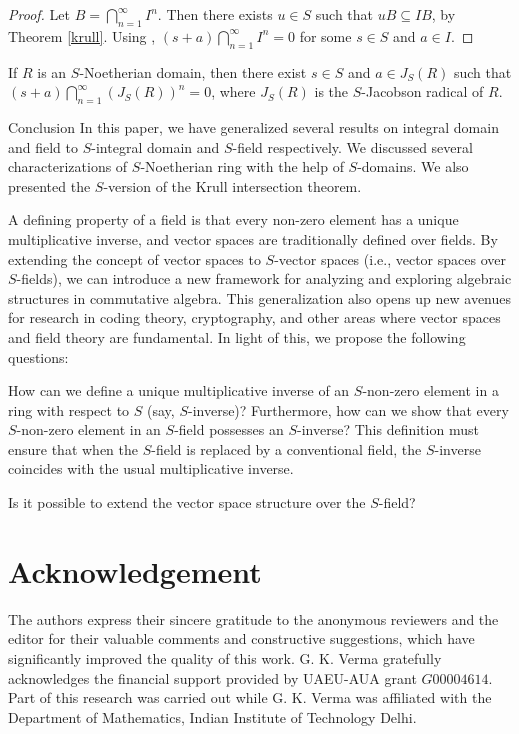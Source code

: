 \documentclass[11pt]{article}
\begin{document}
\begin{proof}
	
	Let $B=\bigcap\limits_{n=1}^{\infty}I^{n}$. Then there exists $u\in S$ such that $uB\subseteq IB$, by Theorem \ref{krull}. Using \cite[Remark 2.1]{ah2020}, $(s+a)\bigcap\limits_{n=1}^{\infty}I^{n}=0$ for some $s\in S$ and $a\in I$.
\end{proof} 
\begin{cor}
	
	If $R$ is an $S$-Noetherian domain, then there exist $s\in S$ and $a\in J_{S}(R)$ such that  $(s+a)\bigcap\limits_{n=1}^{\infty}(J_{S}(R))^{n}=0$, where $J_{S}(R)$ is the $S$-Jacobson radical of $R$.
\end{cor}


	\begin{section}{Conclusion}
		In this paper, we have generalized several results on integral domain and field to $S$-integral domain and $S$-field respectively. We discussed several characterizations of $S$-Noetherian ring with the help of $S$-domains. We also presented the $S$-version of the Krull intersection theorem.
		
		A defining property of a field is that every non-zero element has a unique multiplicative inverse, and vector spaces are traditionally defined over fields. By extending the concept of vector spaces to $S$-vector spaces (i.e., vector spaces over $S$-fields), we can introduce a new framework for analyzing and exploring algebraic structures in commutative algebra. This generalization also opens up new avenues for research in coding theory, cryptography, and other areas where vector spaces and field theory are fundamental. In light of this, we propose the following questions:
		\begin{question}
			How can we define a unique multiplicative inverse of an $S$-non-zero element in a ring with respect to $S$ (say, $S$-inverse)? Furthermore, how can we show that every $S$-non-zero element in an $S$-field possesses an $S$-inverse? This definition must ensure that when the $S$-field is replaced by a conventional field, the $S$-inverse coincides with the usual multiplicative inverse.
		\end{question}
		\begin{question}
			Is it possible to extend the vector space structure over the $S$-field? 
		\end{question}
	\end{section}

    \section*{Acknowledgement}
    The authors express their sincere gratitude to the anonymous reviewers and the editor for their valuable comments and constructive suggestions, which have significantly improved the quality of this work.  G. K. Verma gratefully acknowledges the financial support provided by  UAEU-AUA grant $G00004614$.  Part of this research was carried out while G. K. Verma was affiliated with the Department of Mathematics, Indian Institute of Technology Delhi.
\end{document}
